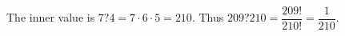 The inner value is $7?4=7\cdot6\cdot5=210$. Thus $209?210=\dfrac{209!}{210!}=\boxed{\dfrac{1}{210}}$.
